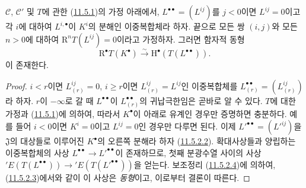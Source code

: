 \begin{proposition}[11.5.3]
\label{0.11.5.3-ko}
$\mathcal C$, $\mathcal C'$ 및 $T$에 관한
(\hyperref[0.11.5.1-ko]{11.5.1})의 가정 아래에서,
$L^{\bullet\bullet}=(L^{ij})$를 $j<0$이면 $L^{ij}=0$이고 각 $i$에
대하여 $L^{i,\bullet}$이 $K^i$의 분해인 이중복합체라 하자. 끝으로
모든 쌍 $(i,j)$와 모든 $n>0$에 대하여
$\mathrm R^nT(L^{ij})=0$이라고 가정하자. 그러면 함자적 동형
\[
  \label{0.11.5.3.1-ko}
  \mathrm R^\bullet T(K^\bullet)\xrightarrow{\sim}
  \mathrm H^\bullet(T(L^{\bullet\bullet})).
  \tag{11.5.3.1}
\]
이 존재한다.
\end{proposition}

\begin{proof}
$i<r$이면 $L_{(r)}^{ij}=0$, $i\geq r$이면
$L_{(r)}^{ij}=L^{ij}$인 이중복합체를
$L_{(r)}^{\bullet\bullet}=(L_{(r)}^{ij})$라 하자. $r$이
$-\infty$로 갈 때 $L^{\bullet\bullet}$이
$L_{(r)}^{\bullet\bullet}$의 귀납극한임은 곧바로 알 수 있다.
$T$에 대한 가정과 (\hyperref[0.11.5.1-ko]{11.5.1})에 의하여, 따라서
$K^\bullet$이 아래로 유계인 경우만 증명하면 충분하다. 예를 들어
$i<0$이면 $K^i=0$이고 $L^{ij}=0$인 경우만 다루면 된다. 이제
$L'^{\bullet\bullet}=(L'^{ij})$을 $\mathfrak J$의 대상들로 이루어진
$K^\bullet$의 오른쪽 분해라 하자
(\hyperref[0.11.5.2.2-ko]{11.5.2.2}). 확대사상들과 양립하는
이중복합체의 사상 $L^{\bullet\bullet}\to L'^{\bullet\bullet}$이
존재하므로, 첫째 분광수열 사이의 사상
$'E(T(L^{\bullet\bullet}))\to{}'E(T(L'^{\bullet\bullet}))$을 얻는다.
보조정리 (\hyperref[0.11.5.2.4-ko]{11.5.2.4})에 의하여,
(\hyperref[0.11.5.2.3-ko]{11.5.2.3})에서와 같이 이 사상은
\emph{동형}이고, 이로부터 결론이 따른다.
\end{proof}

